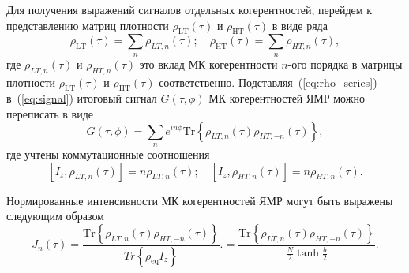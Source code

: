 Для получения выражений сигналов отдельных когерентностей,
перейдем к представлению матриц плотности
$\rho_\mathrm{LT} (\tau)$ и $\rho_\mathrm{HT} (\tau)$
в виде ряда
%
\begin{equation}\label{eq:rho_series}
  \rho_\mathrm{LT} (\tau) = \sum_n \rho_{LT, n}(\tau); \quad
  \rho_\mathrm{HT} (\tau) = \sum_n \rho_{HT, n}(\tau),
\end{equation}
%
где $\rho_{LT, n} (\tau)$ и  $\rho_{HT, n} (\tau)$
это вклад МК когерентности $n$-ого порядка
в матрицы плотности $\rho_\mathrm{LT} (\tau)$ и $\rho_\mathrm{HT} (\tau)$ соответственно.
Подставляя~(\ref{eq:rho_series}) в~(\ref{eq:signal}) итоговый сигнал $G(\tau, \phi)$ МК когерентностей ЯМР можно переписать в виде
%
\begin{equation}
    \label{eq:signal_series}
    G(\tau, \phi) = \sum\limits_n
    e^{in\phi}\mathrm{Tr} \left\{
    \rho_{LT, n}(\tau) \rho_{HT, -n} (\tau)
    \right\},
\end{equation}
%
где учтены коммутационные соотношения
%
\begin{equation}
    \left[I_z, \rho_{LT, n} (\tau) \right] = n  \rho_{LT, n} (\tau);
    \quad
    \left[I_z, \rho_{HT, n} (\tau) \right] = n  \rho_{HT, n} (\tau).
\end{equation}

Нормированные интенсивности МК когерентностей ЯМР могут быть выражены следующим образом
%
\begin{equation}
    \label{eq:coherence}
    J_n(\tau)
    = \dfrac{
       \mathrm{Tr} \left\{
        \rho_{LT, n}(\tau) \rho_{HT, -n} (\tau)
        \right\}
    }{Tr \left\{\rho_{\mathrm{eq}}I_z\right\}}.
    = \dfrac{
       \mathrm{Tr} \left\{
        \rho_{LT, n}(\tau) \rho_{HT, -n} (\tau)
        \right\}
    }{\frac N 2 \tanh \frac b 2}.
\end{equation}

